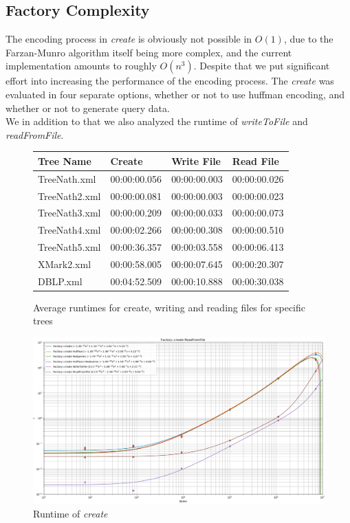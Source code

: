 \documentclass{article}
\begin{document}
\subsection{Factory Complexity}
The encoding process in \textit{create} is obviously not possible in $O(1)$, due to the Farzan-Munro algorithm itself being more complex, and the current implementation amounts to roughly $O(n^{3})$. Despite that we put significant effort into increasing the performance of the encoding process. The \textit{create} was evaluated in four separate options, whether or not to use huffman encoding, and whether or not to generate query data.\\
We in addition to that we also analyzed the runtime of \textit{writeToFile} and \textit{readFromFile}.
\begin{figure}[h]
	\begin{tabular}{ |p{3cm}||p{}|p{}|p{}| }
		 \hline
		 Tree Name & Create & Write File &Read File\\
		 \hline
		 TreeNath.xml   & 00:00:00.056    & 00:00:00.003 &   00:00:00.026 \\
		 TreeNath2.xml&   00:00:00.081  & 00:00:00.003   & 00:00:00.023 \\
		 TreeNath3.xml&00:00:00.209 &00:00:00.033&  00:00:00.073\\
		 TreeNath4.xml&00:00:02.266& 00:00:00.308&  00:00:00.510\\
		 TreeNath5.xml&00:00:36.357&00:00:03.558&00:00:06.413\\
		 XMark2.xml&00:00:58.005&00:00:07.645&00:00:20.307\\
		 DBLP.xml&00:04:52.509&00:00:10.888&00:00:30.038\\
		 \hline
	\end{tabular}
\caption{Average runtimes for create, writing and reading files for specific trees}
\label{complexFac:table1}
\end{figure}
\begin{figure}[h]
\includegraphics[scale=0.3]{file_compare_cut}
\caption{Runtime of \textit{create}}
\label{complexFac:image1}
\end{figure}
\end{document}
